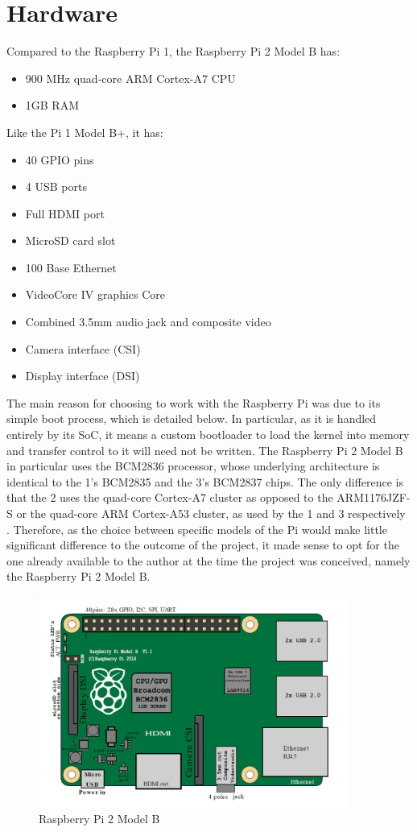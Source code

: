 \documentclass[10pt,a4paper]{article}
\begin{document}
\section*{Hardware}
Compared to the Raspberry Pi 1, the Raspberry Pi 2 Model B has:
\begin{itemize}
    \itemsep0em
    \item 900 MHz quad-core ARM Cortex-A7 CPU
    \item 1GB RAM
\end{itemize}
Like the Pi 1 Model B+, it has:
\begin{itemize}
    \itemsep0em
    \item 40 GPIO pins
    \item 4 USB ports
    \item Full HDMI port
    \item MicroSD card slot
    \item 100 Base Ethernet
    \item VideoCore IV graphics Core
    \item Combined 3.5mm audio jack and composite video
    \item Camera interface (CSI)
    \item Display interface (DSI)
\end{itemize}

The main reason for choosing to work with the Raspberry Pi was due to its simple
boot process, which is detailed below. In particular, as it is handled entirely
by its SoC, it means a custom bootloader to load the kernel into memory and
transfer control to it will need not be written. The Raspberry Pi 2 Model B in
particular uses the BCM2836 processor, whose underlying architecture is
identical to the 1's BCM2835 and the 3's BCM2837 chips. The only difference is
that the 2 uses the quad-core Cortex-A7 cluster as opposed to the ARM1176JZF-S
or the quad-core ARM Cortex-A53 cluster, as used by the 1 and 3 respectively
\cite{BCM2835,BCM2837}.
Therefore, as the choice between specific models of the Pi would make little
significant difference to the outcome of the project, it made sense to opt for
the one already available to the author at the time the project was conceived,
namely the Raspberry Pi 2 Model B.

\begin{figure}[h]
    \begin{center}
        \includegraphics[width=4in]{pi-diag.png}
        \caption{Raspberry Pi 2 Model B}
    \end{center}
\end{figure}
\end{document}
